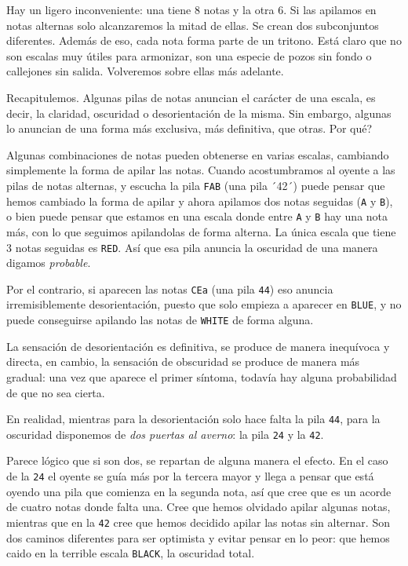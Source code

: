\documentclass[]{article}
\begin{document}
Hay un ligero inconveniente: una tiene 8 notas y la otra 6. Si las apilamos en notas alternas solo alcanzaremos la mitad de ellas. Se crean dos subconjuntos diferentes. Además de eso, cada nota forma parte de un tritono. Está claro que no son escalas muy útiles para armonizar, son una especie de pozos sin fondo o callejones sin salida. Volveremos sobre ellas más adelante.

Recapitulemos. Algunas pilas de notas anuncian el carácter de una escala, es decir, la claridad, oscuridad o desorientación de la misma. Sin embargo, algunas lo anuncian de una forma más exclusiva, más definitiva, que otras. Por qué?

Algunas combinaciones de notas pueden obtenerse en varias escalas, cambiando simplemente la forma de apilar las notas. Cuando acostumbramos al oyente a las pilas de notas alternas, y escucha la pila \texttt{FAB} (una pila ´42´) puede pensar que hemos cambiado la forma de apilar y ahora apilamos dos notas seguidas (\texttt{A} y \texttt{B}), o bien puede pensar que estamos en una escala donde entre \texttt{A} y \texttt{B} hay una nota más, con lo que seguimos apilandolas de forma alterna. La única escala que tiene 3 notas seguidas es \texttt{RED}. Así que esa pila anuncia la oscuridad de una manera digamos \emph{probable}.

Por el contrario, si aparecen las notas \texttt{CEa} (una pila \texttt{44}) eso anuncia irremisiblemente desorientación, puesto que solo empieza a aparecer en \texttt{BLUE}, y no puede conseguirse apilando las notas de \texttt{WHITE} de forma alguna.

La sensación de desorientación es definitiva, se produce de manera inequívoca y directa, en cambio, la sensación de obscuridad se produce de manera más gradual: una vez que aparece el primer síntoma, todavía hay alguna probabilidad de que no sea cierta.

En realidad, mientras para la desorientación solo hace falta la pila \texttt{44}, para la oscuridad disponemos de \emph{dos puertas al averno}: la pila \texttt{24} y la \texttt{42}.

Parece lógico que si son dos, se repartan de alguna manera el efecto. En el caso de la \texttt{24} el oyente se guía más por la tercera mayor y llega a pensar que está oyendo una pila que comienza en la segunda nota, así que cree que es un acorde de cuatro notas donde falta una. Cree que hemos olvidado apilar algunas notas, mientras que en la \texttt{42} cree que hemos decidido apilar las notas sin alternar. Son dos caminos diferentes para ser optimista y evitar pensar en lo peor: que hemos caido en la terrible escala \texttt{BLACK}, la oscuridad total.
\end{document}

